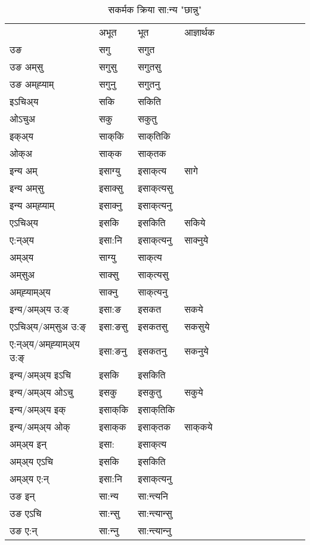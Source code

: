 \begin{table}[H]
\centering
\caption{\label{ak.vt} सकर्मक क्रिया  सा:न्य  "छान्नु"  }
\begin{tabular}{l|l|l|l|l|l|l|l|l|l|l|l|l}  \toprule
&अभूत & भूत & आज्ञार्थक \\ 
उङ &सगु &सगुत \\ 
उङ अम्‌सु &सगुसु &सगुतसु \\ 
उङ अम्‌ह्‍याम् &सगुनु &सगुतनु \\ 
इऽचिअ्य &सकि &सकिति   \\ 
ओऽचुअ &सकु &सकुतु   \\ 
इक्अ्य &साक्‌कि &साक्‌तिकि   \\ 
ओक्अ &साक्‌क &साक्‌तक   \\ 
इन्य अम् & इसाग्यु  & इसाक्‌त्य &सागे  \\ 
इन्य अम्‌सु & इसाक्सु  & इसाक्‌त्यसु   \\ 
इन्य अम्‌ह्‍याम् & इसाक्‍नु  & इसाक्‌त्यनु   \\ 
एऽचिअ्य & इसकि & इसकिति &सकिये    \\ 
ए:न्अ्य & इसा:नि  & इसाक्‌त्यनु &साक्‍नुये  \\ 
अम्अ्य & साग्यु  & साक्‌त्य  \\ 
अम्‌सुअ & साक्सु & साक्‌त्यसु  \\ 
अम्‌ह्‍याम्अ्य & साक्‍नु  & साक्‌त्यनु \\ 
\midrule
इन्य/अम्अ्य उ:ङ्‌&इसा:ङ & इसकत &सकये \\ 
एऽचिअ्य/अम्‌सुअ उ:ङ्‌ &इसा:ङसु & इसकतसु &सकसुये \\ 
ए:न्अ्य/अम्‌ह्‍याम्अ्य उ:ङ्‌ &इसा:ङनु & इसकतनु &सकनुये \\ 
इन्य/अम्अ्य इऽचि & इसकि & इसकिति    \\ 
इन्य/अम्अ्य ओऽचु & इसकु & इसकुतु  &सकुये  \\ 
इन्य/अम्अ्य इक् & इसाक्‌कि & इसाक्‌तिकि   \\ 
इन्य/अम्अ्य ओक् & इसाक्‌क & इसाक्‌तक  &साक्‌कये  \\ 
अम्अ्य इन् & इसा: & इसाक्‌त्य   \\ 
अम्अ्य एऽचि & इसकि & इसकिति    \\ 
अम्अ्य ए:न् & इसा:नि  & इसाक्‌त्यनु  \\ 
\midrule
उङ इन् & सा:न्य  & सा:न्त्यनि  \\ 
उङ एऽचि & सा:न्सु  & सा:न्त्यान्सु   \\ 
उङ ए:न्& सा:न्‍नु  & सा:न्त्यान्‍नु   \\ 
\bottomrule
\end{tabular}
\end{table}



